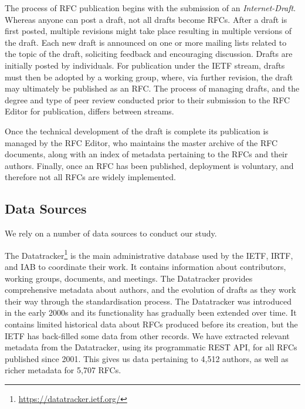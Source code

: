 \documentclass[twocolumn,10pt]{article}
\newcommand{\pb}[1]{\vspace{0.75ex}\noindent{\textbf{#1}}}
\begin{document}
The process of RFC publication begins with the submission of an
\emph{Internet-Draft}. Whereas anyone can post a draft, not all drafts
become RFCs. After a draft is first posted, multiple revisions might take
place resulting in multiple versions of the draft. Each new draft is
announced on one or more mailing lists related to the topic of the draft,
soliciting feedback and encouraging discussion. Drafts are initially posted
by individuals. For publication under the IETF stream, drafts must then be
adopted by a working group, where, via further revision, the draft may
ultimately be published as an RFC. The process of managing drafts, and the
degree and type of peer review conducted prior to their submission to the
RFC Editor for publication, differs between streams.

Once the technical development of the draft is complete its publication is
managed by the RFC Editor, who maintains the master archive of the RFC
documents, along with an index of metadata pertaining to the RFCs and their
authors. Finally, once an RFC has been published, deployment is voluntary,
and therefore not all RFCs are widely implemented.

\subsection{Data Sources}
\label{sec:background:data}


We rely on a number of data sources to conduct our study.

\pb{IETF Datatracker:}
The Datatracker\footnote{\url{https://datatracker.ietf.org/}} is the main
administrative database used by the IETF, IRTF, and IAB to coordinate their
work. It contains information about contributors, working groups,
documents, and meetings. The Datatracker provides comprehensive metadata
about authors, and the evolution of drafts as they work their way through
the standardisation process. The Datatracker was introduced in the early
2000s and its functionality has gradually been extended over time. It
contains limited historical data about RFCs produced before its creation,
but the IETF has back-filled some data from other records.  We have
extracted relevant metadata from the Datatracker, using its programmatic
REST API, for all RFCs published since 2001. This gives us data pertaining
to 4,512 authors, as well as richer metadata for 5,707 RFCs.
\end{document}

